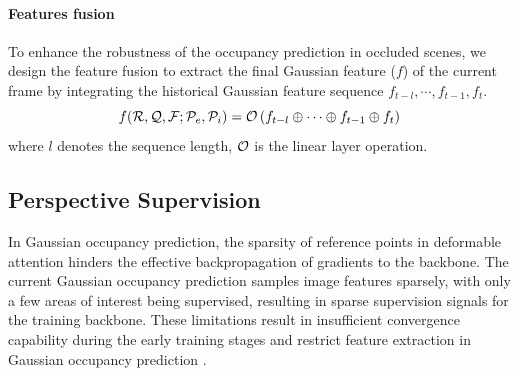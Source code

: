 \documentclass[journal]{IEEEtran}
\begin{document}
\paragraph{Features fusion} 
To enhance the robustness of the occupancy prediction in occluded scenes, we design the feature fusion to extract the final Gaussian feature ($f$) of the current frame by integrating the historical Gaussian feature sequence $f_{t-l}, \cdots, f_{t-1}, f_{t}$.
\begin{equation} \small
f(\mathcal{R},\mathcal{Q}, \mathcal{F}; \mathcal{P}_e, \mathcal{P}_i) = \mathcal{O} \left( f_{t-l} \oplus \cdots \oplus f_{t-1} \oplus f_t \right)
\end{equation}
where $l$ denotes the sequence length, $\small \mathcal{O}$ is the linear layer operation.

\subsection{Perspective Supervision}
\label{subsec:psm}
In Gaussian occupancy prediction, the sparsity of reference points in deformable attention hinders the effective backpropagation of gradients to the backbone.
The current Gaussian occupancy prediction samples image features sparsely, with only a few areas of interest being supervised, resulting in sparse supervision signals for the training backbone.
These limitations result in insufficient convergence capability during the early training stages and restrict feature extraction in Gaussian occupancy prediction \cite{sparse4dv2}.

\end{document}
